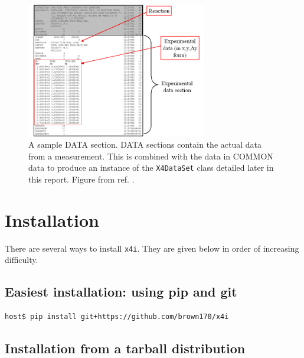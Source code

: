 \documentclass[11pt]{article}
\newcommand{\xfouri}{\texttt{x4i}}
\begin{document}
\begin{figure}[htbp]
\begin{center}
\includegraphics[width=0.7\textwidth]{figs/bib04.png}
\caption{\label{fig:5}A sample DATA section.  DATA sections contain the actual data from a measurement.   This is combined with the data in COMMON data to produce an instance of the \texttt{X4DataSet} class detailed later in this report.  Figure from ref. \cite{web}.}
\end{center}
\end{figure}

\clearpage

\section{Installation}
There are several ways to install \xfouri.  They are given below in order of increasing difficulty.

\subsection{Easiest installation: using pip and git}
\begin{verbatim}
host$ pip install git+https://github.com/brown170/x4i
\end{verbatim}

\subsection{Installation from a tarball distribution}
\end{document}
